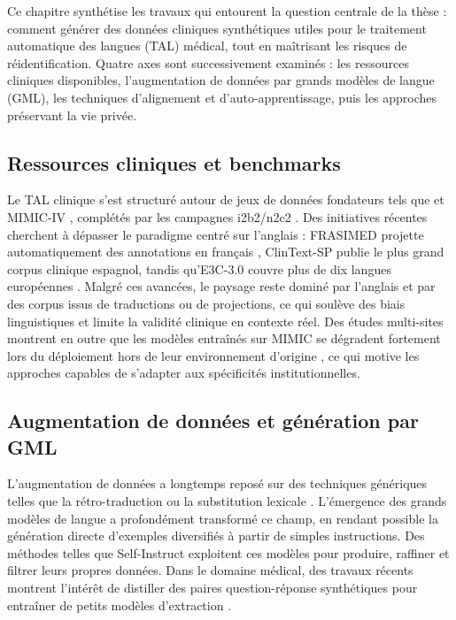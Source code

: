 
Ce chapitre synthétise les travaux qui entourent la question centrale de la thèse : comment générer des données cliniques synthétiques utiles pour le traitement automatique des langues (TAL) médical, tout en maîtrisant les risques de réidentification.
Quatre axes sont successivement examinés : les ressources cliniques disponibles, l'augmentation de données par grands modèles de langue (GML), les techniques d'alignement et d'auto-apprentissage, puis les approches préservant la vie privée.

\subsection{Ressources cliniques et benchmarks}

Le TAL clinique s'est structuré autour de jeux de données fondateurs tels que \mimic{} et MIMIC-IV \citep{Johnson2016MIMIC-IIIDatabase}, complétés par les campagnes i2b2/n2c2 \citep{uzunerPracticalApplicationsNatural2015}.
Des initiatives récentes cherchent à dépasser le paradigme centré sur l'anglais : FRASIMED projette automatiquement des annotations en français \citep{zaghir2024frasimed}, ClinText-SP publie le plus grand corpus clinique espagnol, tandis qu'E3C-3.0 couvre plus de dix langues européennes \citep{ghosh2025e3c}.
Malgré ces avancées, le paysage reste dominé par l'anglais et par des corpus issus de traductions ou de projections, ce qui soulève des biais linguistiques et limite la validité clinique en contexte réel.
Des études multi-sites montrent en outre que les modèles entraînés sur MIMIC se dégradent fortement lors du déploiement hors de leur environnement d'origine \citep{adekkanattuEvaluatingPortabilityNLP2019}, ce qui motive les approches capables de s'adapter aux spécificités institutionnelles.

\subsection{Augmentation de données et génération par GML}

L'augmentation de données a longtemps reposé sur des techniques génériques telles que la rétro-traduction ou la substitution lexicale \citep{wei2019eda}.
L'émergence des grands modèles de langue a profondément transformé ce champ, en rendant possible la génération directe d'exemples diversifiés à partir de simples instructions.
Des méthodes telles que Self-Instruct \citep{wangSelfInstructAligningLanguage2023} exploitent ces modèles pour produire, raffiner et filtrer leurs propres données.
Dans le domaine médical, des travaux récents montrent l'intérêt de distiller des paires question-réponse synthétiques pour entraîner de petits modèles d'extraction \citep{woo2025synthetic}.

